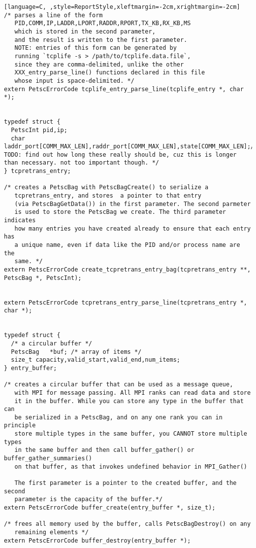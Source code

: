 \documentclass[11pt]{article}
\begin{document}
\begin{lstlisting}[language=C, ,style=ReportStyle,xleftmargin=-2cm,xrightmargin=-2cm]
/* parses a line of the form 
   PID,COMM,IP,LADDR,LPORT,RADDR,RPORT,TX_KB,RX_KB,MS
   which is stored in the second parameter, 
   and the result is written to the first parameter.
   NOTE: entries of this form can be generated by 
   running `tcplife -s > /path/to/tcplife.data.file`, 
   since they are comma-delimited, unlike the other 
   XXX_entry_parse_line() functions declared in this file
   whose input is space-delimited. */
extern PetscErrorCode tcplife_entry_parse_line(tcplife_entry *, char *);


typedef struct {
  PetscInt pid,ip;
  char     laddr_port[COMM_MAX_LEN],raddr_port[COMM_MAX_LEN],state[COMM_MAX_LEN];/* TODO: find out how long these really should be, cuz this is longer than necessary. not too important though. */
} tcpretrans_entry;

/* creates a PetscBag with PetscBagCreate() to serialize a
   tcpretrans_entry, and stores  a pointer to that entry
   (via PetscBagGetData()) in the first parameter. The second parmeter
   is used to store the PetscBag we create. The third parameter indicates
   how many entries you have created already to ensure that each entry has
   a unique name, even if data like the PID and/or process name are the 
   same. */
extern PetscErrorCode create_tcpretrans_entry_bag(tcpretrans_entry **, PetscBag *, PetscInt);


extern PetscErrorCode tcpretrans_entry_parse_line(tcpretrans_entry *, char *);


typedef struct {
  /* a circular buffer */
  PetscBag   *buf; /* array of items */
  size_t capacity,valid_start,valid_end,num_items;
} entry_buffer;

/* creates a circular buffer that can be used as a message queue, 
   with MPI for message passing. All MPI ranks can read data and store
   it in the buffer. While you can store any type in the buffer that can
   be serialized in a PetscBag, and on any one rank you can in principle
   store multiple types in the same buffer, you CANNOT store multiple types
   in the same buffer and then call buffer_gather() or buffer_gather_summaries()
   on that buffer, as that invokes undefined behavior in MPI_Gather()

   The first parameter is a pointer to the created buffer, and the second 
   parameter is the capacity of the buffer.*/
extern PetscErrorCode buffer_create(entry_buffer *, size_t);

/* frees all memory used by the buffer, calls PetscBagDestroy() on any
   remaining elements */
extern PetscErrorCode buffer_destroy(entry_buffer *);


\end{lstlisting}
\end{document}
